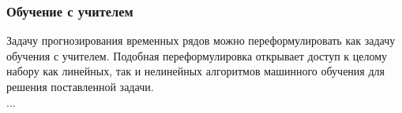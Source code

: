 






\subsubsection{Обучение с учителем}

Задачу прогнозирования временных рядов можно переформулировать как 
задачу обучения с учителем. Подобная переформулировка открывает 
доступ к целому набору как линейных, так и нелинейных алгоритмов 
машинного обучения для решения поставленной задачи. \\

...




